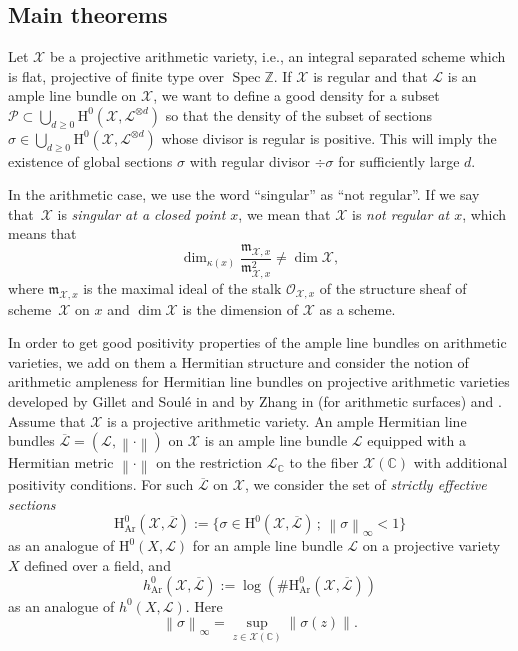 \documentclass[11pt]{article}
\newcommand{\ie}{i.e.,\xspace}
\numberwithin{equation}{section}
\newcommand{\sep}{\,;\,}
\theoremstyle{plain}
\theoremstyle{definition}
\newcommand{\ho}{\mathrm{H}}
\newcommand{\X}{\mathcal{X}}
\newcommand{\Li}{\overline{\mathcal{L}}{}}
\newcommand{\li}{\mathcal{L}}
\newcommand{\Z}{\mathbb{Z}}
\newcommand{\bbC}{\mathbb{C}}
\DeclareMathOperator{\Spec}{Spec}
\begin{document}
\subsection{Main theorems}

Let $\X$ be a projective arithmetic variety, \ie an integral separated scheme which is flat, projective of finite type over $\Spec \Z$. If $\X$ is regular and that $\li$ is an ample line bundle on $\X$, we want to define a good density for a subset $\mathcal{P}\subset \bigcup_{d\geq 0}\ho^{0}(\X,\li^{\otimes d})$ so that the density of the subset of sections $\sigma\in \bigcup_{d\geq 0}\ho^{0}(\X,\li^{\otimes d})$ whose divisor is regular is positive. This will imply the existence of global sections $\sigma$ with regular divisor $\div \sigma$ for sufficiently large $d$.

In the arithmetic case, we use the word ``singular'' as ``not regular''. If we say that~$\X$ is \emph{singular at a closed point $x$}, we mean that $\X$ is \emph{not regular at $x$}, which means that
\[
\dim_{\kappa(x)} \frac{\mathfrak{m}_{\X, x}}{\mathfrak{m}^2_{\X, x}}\not=\dim \X,
\]
where $\mathfrak{m}_{\X, x}$ is the maximal ideal of the stalk $\mathcal{O}_{\X, x}$ of the structure sheaf of scheme~$\X$ on $x$ and $\dim\X$ is the dimension of $\X$ as a scheme.

In order to get good positivity properties of the ample line bundles on arithmetic varieties, we add on them a Hermitian structure and consider the notion of arithmetic ampleness for Hermitian line bundles on projective arithmetic varieties developed by Gillet and Soulé in \cite{GS92} and by Zhang in \cite{Zh92} (for arithmetic surfaces) and \cite{Zh95}. Assume that $\X$ is a projective arithmetic variety. An ample Hermitian line bundles $\Li=(\li, \left\lVert \cdot \right\rVert)$ on $\X$ is an ample line bundle $\li$ equipped with a Hermitian metric $\left\lVert \cdot \right\rVert$ on the restriction $\li_{\bbC}$ to the fiber $\X(\bbC)$ with additional positivity conditions. For such $\Li$ on $\X$, we consider the set of \emph{strictly effective sections}
\[
\ho_{\mathrm{Ar}}^0(\X, \Li):= \{ \sigma\in \ho^0(\X, \Li) \sep \left\lVert \sigma \right\rVert_{\infty}<1 \}
\]
as an analogue of $\ho^0(X,\li)$ for an ample line bundle $\li$ on a projective variety $X$ defined over a field, and
\[
h_{\mathrm{Ar}}^0(\X, \Li):= \log\left(\#\ho_{\mathrm{Ar}}^0(\X, \Li) \right)
\]
as an analogue of $h^0(X,\li)$. Here
\[
\left\lVert \sigma \right\rVert_{\infty}=\sup_{z\in \X(\bbC)}\lVert \sigma(z)\rVert.
\]
\end{document}
